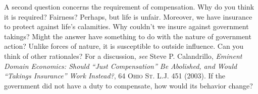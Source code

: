 A second question concerns the requirement of compensation. Why do you think it
is required? Fairness? Perhaps, but life is unfair. Moreover, we have insurance
to protect against life's calamities. Why couldn't we insure against government
takings? Might the answer have something to do with the nature of government
action? Unlike forces of nature, it is susceptible to outside influence. Can you
think of other rationales? For a discussion, \textit{see} Steve P. Calandrillo,
\textit{Eminent Domain Economics: Should ``Just Compensation'' Be Abolished, and
Would ``Takings Insurance'' Work Instead?}, 64 \textsc{Ohio St}. L.J. 451
(2003). If the government did not have a duty to compensate, how would its
behavior change?


